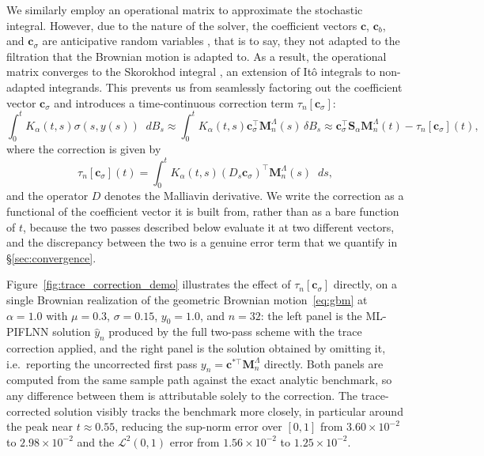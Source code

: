 \documentclass[11pt, a4paper]{article}
\theoremstyle{theoremstyle}
\theoremstyle{definitionstyle}
\newcommand{\dd}{\mathop{}\!d}
\begin{document}
We similarly employ an operational matrix to approximate the stochastic integral. However, due to the nature of the solver, the coefficient vectors $\mathbf c$, $\mathbf c_b$, and $\mathbf c_\sigma$ are anticipative random variables \cite{NualartPardoux1988}, that is to say, they not adapted to the filtration that the Brownian motion is adapted to. As a result, the operational matrix converges to the Skorokhod integral \cite{skorokhod1975}, an extension of It\^o integrals to non-adapted integrands. This prevents us from seamlessly factoring out the coefficient vector $\mathbf c_\sigma$ and introduces a time-continuous correction term $\tau_n[\mathbf c_\sigma]$:
\begin{equation}\label{stoch_approx_m}
    \int_0^t K_\alpha(t, s)\sigma(s, y(s))\dd{B_s} \approx \int_0^t K_\alpha(t, s)\mathbf c_\sigma^\top \mathbf M_n^\Lambda(s) \, \delta B_s \approx \mathbf c_\sigma^\top \mathbf S_\alpha \mathbf M_n^\Lambda(t) - \tau_n[\mathbf c_\sigma](t),
\end{equation}
where the correction is given by
\begin{equation}\label{eq:trace_intro}
    \tau_n[\mathbf c_\sigma](t) = \int_0^t K_\alpha(t, s)(D_s \mathbf c_\sigma)^\top \mathbf M_n^\Lambda(s) \dd{s},
\end{equation}
and the operator $D$ denotes the Malliavin derivative. We write the correction as a functional of the coefficient vector it is built from, rather than as a bare function of $t$, because the two passes described below evaluate it at two different vectors, and the discrepancy between the two is a genuine error term that we quantify in \S\ref{sec:convergence}.

Figure~\ref{fig:trace_correction_demo} illustrates the effect of $\tau_n[\mathbf c_\sigma]$ directly, on a single Brownian realization of the geometric Brownian motion~\eqref{eq:gbm} at $\alpha = 1.0$ with $\mu = 0.3$, $\sigma = 0.15$, $y_0 = 1.0$, and $n = 32$: the left panel is the ML-PIFLNN solution $\hat y_n$ produced by the full two-pass scheme with the trace correction applied, and the right panel is the solution obtained by omitting it, i.e.\ reporting the uncorrected first pass $y_n = \mathbf c^{*\top}\mathbf M_n^\Lambda$ directly. Both panels are computed from the same sample path against the exact analytic benchmark, so any difference between them is attributable solely to the correction. The trace-corrected solution visibly tracks the benchmark more closely, in particular around the peak near $t \approx 0.55$, reducing the sup-norm error over $[0,1]$ from $3.60\times10^{-2}$ to $2.98\times10^{-2}$ and the $\mathcal L^2(0,1)$ error from $1.56\times10^{-2}$ to $1.25\times10^{-2}$.
\end{document}
